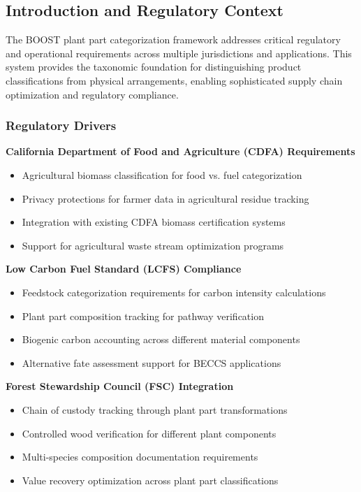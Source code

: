 
\subsection{Introduction and Regulatory Context}
\label{sec:plant-parts-intro}

The BOOST plant part categorization framework addresses critical regulatory and operational requirements across multiple jurisdictions and applications. This system provides the taxonomic foundation for distinguishing product classifications from physical arrangements, enabling sophisticated supply chain optimization and regulatory compliance.

\subsubsection{Regulatory Drivers}

\textbf{California Department of Food and Agriculture (CDFA) Requirements}
\begin{itemize}
    \item Agricultural biomass classification for food vs. fuel categorization
    \item Privacy protections for farmer data in agricultural residue tracking  
    \item Integration with existing CDFA biomass certification systems
    \item Support for agricultural waste stream optimization programs
\end{itemize}

\textbf{Low Carbon Fuel Standard (LCFS) Compliance}
\begin{itemize}
    \item Feedstock categorization requirements for carbon intensity calculations
    \item Plant part composition tracking for pathway verification
    \item Biogenic carbon accounting across different material components
    \item Alternative fate assessment support for BECCS applications
\end{itemize}

\textbf{Forest Stewardship Council (FSC) Integration}
\begin{itemize}
    \item Chain of custody tracking through plant part transformations
    \item Controlled wood verification for different plant components
    \item Multi-species composition documentation requirements
    \item Value recovery optimization across plant part classifications
\end{itemize}

